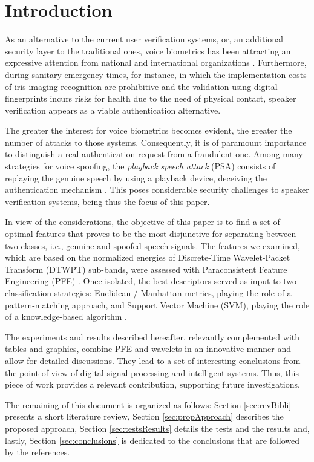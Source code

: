 \section{Introduction}
\label{introduction}
\par As an alternative to the current user verification systems, or, an additional security layer to the traditional ones, voice biometrics has been attracting an expressive attention from national and international organizations \cite{vs1}\cite{dsp2}. Furthermore, during sanitary emergency times, for instance, in which the implementation costs of iris imaging recognition are prohibitive and the validation using digital fingerprints incurs risks for health due to the need of physical contact, speaker verification appears as a viable authentication alternative.
\\				
\par The greater the interest for voice biometrics becomes evident, the greater the number of attacks to those systems. Consequently, it is of paramount importance to distinguish a real authentication request from a fraudulent one. Among many strategies for voice spoofing, the \textit{playback speech attack} (PSA) consists of replaying the genuine speech by using a playback device, deceiving the authentication mechanism \cite{vs2}\cite{dsp3}\cite{dsp4}. This poses considerable security challenges to speaker verification systems, being thus the focus of this paper. 
\\
\par In view of the considerations, the objective of this paper is to find a set of optimal features that proves to be the most disjunctive for separating between two classes, i.e., genuine and spoofed speech signals. The features we examined, which are based on the normalized energies of Discrete-Time Wavelet-Packet Transform (DTWPT) \cite{dwt1} sub-bands, were assessed with Paraconsistent Feature Engineering (PFE) \cite{8588433}. Once isolated, the best descriptors served as input to two classification strategies: Euclidean / Manhattan metrics, playing the role of a pattern-matching approach, and Support Vector Machine (SVM), playing the role of a knowledge-based algorithm \cite{bishop:2006:PRML}.
\\
\par The experiments and results described hereafter, relevantly complemented with tables and graphics, combine PFE and wavelets in an innovative manner and allow for detailed discussions. They lead to a set of interesting conclusions from the point of view of digital signal processing and intelligent systems. Thus, this piece of work provides a relevant contribution, supporting future investigations. 
\\
\par The remaining of this document is organized as follows: Section \ref{sec:revBibli} presents a short literature review, Section \ref{sec:propApproach} describes the proposed approach, Section \ref{sec:testsResults} details the tests and the results and, lastly, Section \ref{sec:conclusions} is dedicated to the conclusions that are followed by the references. 